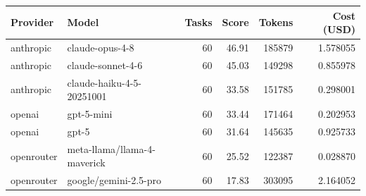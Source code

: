 \begin{tabular}{llrrrr}
\toprule
Provider & Model & Tasks & Score & Tokens & Cost (USD) \\
\midrule
anthropic & claude-opus-4-8 & 60 & 46.91 & 185879 & 1.578055 \\
anthropic & claude-sonnet-4-6 & 60 & 45.03 & 149298 & 0.855978 \\
anthropic & claude-haiku-4-5-20251001 & 60 & 33.58 & 151785 & 0.298001 \\
openai & gpt-5-mini & 60 & 33.44 & 171464 & 0.202953 \\
openai & gpt-5 & 60 & 31.64 & 145635 & 0.925733 \\
openrouter & meta-llama/llama-4-maverick & 60 & 25.52 & 122387 & 0.028870 \\
openrouter & google/gemini-2.5-pro & 60 & 17.83 & 303095 & 2.164052 \\
\bottomrule
\end{tabular}
